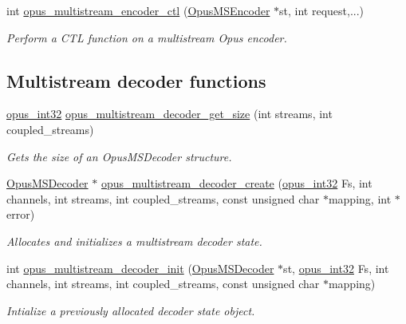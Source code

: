 \begin{DoxyCompactItemize}
int \hyperlink{group__opus__multistream_gae14328330c548dede66c494f51e33707}{opus\+\_\+multistream\+\_\+encoder\+\_\+ctl} (\hyperlink{group__opus__multistream_gae5826674d142fc873ebc1d781c507dd7}{Opus\+M\+S\+Encoder} $\ast$st, int request,...)
\begin{DoxyCompactList}\small\item\em Perform a C\+TL function on a multistream Opus encoder. \end{DoxyCompactList}\end{DoxyCompactItemize}
\subsection*{Multistream decoder functions}
\begin{DoxyCompactItemize}
\item 
\hyperlink{opus__types_8h_aa4d309d6f80b99dbabebc8f98879ab9a}{opus\+\_\+int32} \hyperlink{group__opus__multistream_ga38d745963e7903890c80278bc2569c39}{opus\+\_\+multistream\+\_\+decoder\+\_\+get\+\_\+size} (int streams, int coupled\+\_\+streams)
\begin{DoxyCompactList}\small\item\em Gets the size of an {\ttfamily Opus\+M\+S\+Decoder} structure. \end{DoxyCompactList}\item 
\hyperlink{group__opus__multistream_gad3497495deb9a8ace82e76cd4f93e0e4}{Opus\+M\+S\+Decoder} $\ast$ \hyperlink{group__opus__multistream_ga3c0e342774174c471e61cedba53755c9}{opus\+\_\+multistream\+\_\+decoder\+\_\+create} (\hyperlink{opus__types_8h_aa4d309d6f80b99dbabebc8f98879ab9a}{opus\+\_\+int32} Fs, int channels, int streams, int coupled\+\_\+streams, const unsigned char $\ast$mapping, int $\ast$error)
\begin{DoxyCompactList}\small\item\em Allocates and initializes a multistream decoder state. \end{DoxyCompactList}\item 
int \hyperlink{group__opus__multistream_ga09a4d14fc497d4f6fbe76bd1c5d45436}{opus\+\_\+multistream\+\_\+decoder\+\_\+init} (\hyperlink{group__opus__multistream_gad3497495deb9a8ace82e76cd4f93e0e4}{Opus\+M\+S\+Decoder} $\ast$st, \hyperlink{opus__types_8h_aa4d309d6f80b99dbabebc8f98879ab9a}{opus\+\_\+int32} Fs, int channels, int streams, int coupled\+\_\+streams, const unsigned char $\ast$mapping)
\begin{DoxyCompactList}\small\item\em Intialize a previously allocated decoder state object. \end{DoxyCompactList}\item 

\end{DoxyCompactItemize}
